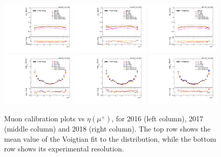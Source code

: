 \begin{figure}[!htb]
      \centering
      \captionsetup{justification=justified}
      \includegraphics[width=0.32\textwidth]{pics/muon_corr/muon_cal/2016/muP_eta_summary_mean.pdf}
      \includegraphics[width=0.32\textwidth]{pics/muon_corr/muon_cal/2017/muP_eta_summary_mean.pdf}
      \includegraphics[width=0.32\textwidth]{pics/muon_corr/muon_cal/2018/muP_eta_summary_mean.pdf}
      \includegraphics[width=0.32\textwidth]{pics/muon_corr/muon_cal/2016/muP_eta_summary_reso.pdf}
      \includegraphics[width=0.32\textwidth]{pics/muon_corr/muon_cal/2017/muP_eta_summary_reso.pdf}
      \includegraphics[width=0.32\textwidth]{pics/muon_corr/muon_cal/2018/muP_eta_summary_reso.pdf}
      \caption{Muon calibration plots vs $\eta(\mu^{+})$, for 2016 (left column), 2017 (middle column) and 2018 (right column).
               The top row shows the mean value of the Voigtian fit to the \mmm distribution, 
               while the bottom row shows its experimental resolution.}
      \label{fig:mucal_muP_eta}
\end{figure}


